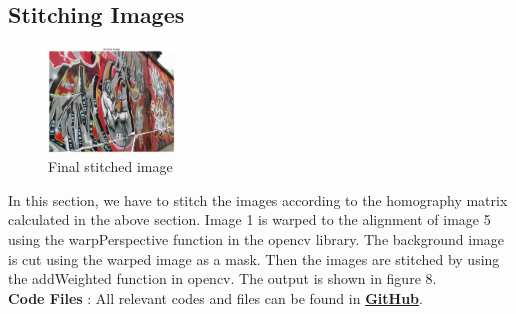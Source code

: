 \documentclass[10.5pt]{article}
\begin{document}
\begin{flushleft}
\subsection{Stitching Images}
\begin{figure}[htp]
    \centering
    \includegraphics[width=0.3\textwidth]{Question3Stitched.png}
    \caption{Final stitched image}
\end{figure}
In this section, we have to stitch the images according to the homography matrix calculated in the above section. Image 1 is warped to the alignment of image 5 using the warpPerspective function in the opencv library. The background image is cut using the warped image as a mask. Then the images are stitched by using the addWeighted function in opencv.
The output is shown in figure 8.
\\
\textbf{Code Files} : All relevant codes and files can be found in \href{https://github.com/K-Thanushan/EN2550-Fundamentals-of-Image-Processing-and-Machine-Vision/tree/main/Assignments/Assignment1}{\textbf{\underline{GitHub}}}.

\end{flushleft}
\end{document}
